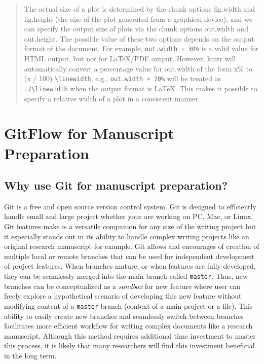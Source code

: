 \documentclass[]{book}
\begin{document}
\begin{quote}
The actual size of a plot is determined by the chunk options fig.width
and fig.height (the size of the plot generated from a graphical device),
and we can specify the output size of plots via the chunk options
out.width and out.height. The possible value of these two options
depends on the output format of the document. For example,
\texttt{out.width\ =\ \textquotesingle{}30\%\textquotesingle{}} is a
valid value for HTML output, but not for LaTeX/PDF output. However,
knitr will automatically convert a percentage value for out.width of the
form x\% to (x / 100) \texttt{\textbackslash{}linewidth}, e.g.,
\texttt{out.width\ =\ \textquotesingle{}70\%\textquotesingle{}} will be
treated as \texttt{.7\textbackslash{}linewidth} when the output format
is LaTeX. This makes it possible to specify a relative width of a plot
in a consistent manner.
\end{quote}

\chapter{GitFlow for Manuscript
Preparation}\label{gitflow-for-manuscript-preparation}

\section{Why use Git for manuscript
preparation?}\label{why-use-git-for-manuscript-preparation}

Git is a free and open source version control system. Git is designed to
efficiently handle small and large project whether your are working on
PC, Mac, or Linux. Git features make is a versatile companion for any
size of the writing project but it especially stands out in its ability
to handle complex writing projects like an original research manuscript
for example. Git allows and encourages of creation of multiple local or
remote branches that can be used for independent development of project
features. When branches mature, or when features are fully developed,
they can be seamlessly merged into the main branch called
\texttt{master}. Thus, new branches can be conceptualized as a
\emph{sandbox} for new feature where user can freely explore a
hypothetical scenario of developing this new feature without modifying
content of a \texttt{master} branch (context of a main project or a
file). This ability to easily create new branches and seamlessly switch
between branches facilitates more efficient workflow for writing complex
documents like a research manuscript. Although this method requires
additional time investment to master this process, it is likely that
many researchers will find this investment beneficial in the long term.
\end{document}
